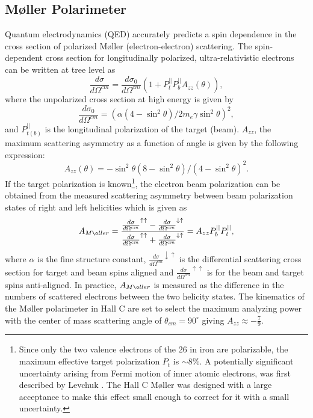 \subsection{M\o ller Polarimeter}
Quantum electrodynamics (QED) accurately predicts a spin dependence in the cross section  of polarized M\o ller (electron-electron) scattering. The spin-dependent cross section for longitudinally polarized, ultra-relativistic electrons can be written at tree level as \cite{Hauger2001}
\begin{equation}
\frac{d\sigma}{d\Omega^{cm}}=\frac{d\sigma_0}{d\Omega^{cm}}\left(1+P_t^{||}P_b^{||}A_{zz}(\theta )\right),
\end{equation}
where the unpolarized cross section at high energy is given by \[\frac{d\sigma_0}{d\Omega^{cm}}=\left(\alpha(4-\sin^2\theta)/2m_e\gamma\sin^2\theta\right)^2,\]  and $P_{t(b)}^{||}$ is the longitudinal polarization of the target (beam). $A_{zz}$, the maximum scattering asymmetry as a function of angle is given by the following expression:\[A_{zz}(\theta )=-\sin^2\theta(8-\sin^2\theta )/(4-\sin^2\theta )^2.\] If the target polarization is known\footnote{Since only the two valence electrons of the 26 in iron are polarizable, the maximum effective target polarization $P_t$ is $\sim$8\%. A potentially significant uncertainty arising from Fermi motion of inner atomic electrons, was first described by Levchuk \cite{Levchuk1994}. The Hall C M\o ller was designed with a large acceptance to make this effect small enough to correct for it with a small uncertainty.}, the electron beam polarization can be obtained from the measured scattering asymmetry between beam polarization states of right and left helicities which is given as 
\begin{equation}
A_{M\o ller}=\frac{\frac{d\sigma}{d\Omega^{cm}}^{\uparrow\uparrow}-\frac{d\sigma}{d\Omega^{cm}}^{\downarrow\uparrow}}{\frac{d\sigma}{d\Omega^{cm}}^{\uparrow\uparrow}+\frac{d\sigma}{d\Omega^{cm}}^{\downarrow\uparrow}}=A_{zz}P_b^{||}P_t^{||},
\label{eq:moller_asym}
\end{equation}
where $\alpha$ is the fine structure constant, $\frac{d\sigma}{d\Omega^{cm}}^{\downarrow\uparrow}$ is the differential scattering cross section for target and beam spins aligned and $\frac{d\sigma}{d\Omega^{cm}}^{\uparrow\uparrow}$ is for the beam and target spins anti-aligned. In practice, $A_{M\o ller}$ is measured as the difference in the numbers of scattered electrons between the two helicity states. The kinematics of the M\o ller polarimeter in Hall C are set to select the maximum analyzing power with the center of mass scattering angle of $\theta_{cm}=90^{\circ}$ giving $A_{zz}\approx-\frac{7}{9}$. 

